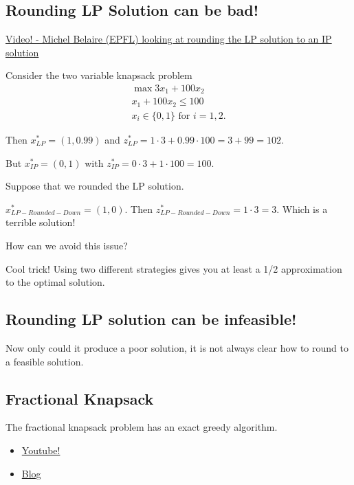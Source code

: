   
  
  \subsection{Rounding LP Solution can be bad!}
  \begin{resource}
  \href{https://youtu.be/Az7HUuq4SOI?t=189}{Video! - Michel Belaire (EPFL) looking at rounding the LP solution to an IP solution}
  \end{resource}
  
  Consider the two variable knapsack problem
  \begin{align}
  \max   3x_1 + 100 x_2\\
              x_1  + 100 x_2 \leq 100\\
              x_i \in \{0,1\} \text{ for } i=1,2.
  \end{align}
  
  Then $x^*_{LP} = (1, 0.99)$ and $z^*_{LP} = 1\cdot 3 + 0.99\cdot 100 = 3 + 99 = 102.$
  
  But $x^*_{IP} = (0,1)$ with $z^*_{IP} = 0\cdot 3 + 1 \cdot 100 = 100$.
  
  Suppose that we rounded the LP solution.  
  
  $x^*_{LP-Rounded-Down} = (1,0)$.  Then $z^*_{LP-Rounded-Down} = 1\cdot 3 = 3$.  Which is a terrible solution!
  
  
  How can we avoid this issue?
  
  
  Cool trick!   Using two different strategies gives you at least a 1/2 approximation to the optimal solution.
  
  
  \subsection{Rounding LP solution can be infeasible!}
  Now only could it produce a poor solution, it is not always clear how to round to a feasible solution.  
  
\subsection{Fractional Knapsack}
The fractional knapsack problem has an exact greedy algorithm.

\begin{resource}
\begin{itemize}
\item \href{https://www.youtube.com/watch?time_continue=424&v=m1p-eWxrt6g}{Youtube!}
\item \href{https://www.geeksforgeeks.org/fractional-knapsack-problem/}{Blog}
\end{itemize}
\end{resource}

